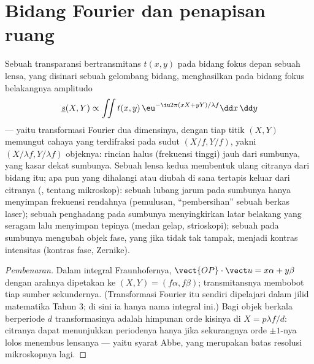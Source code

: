 \section{Bidang Fourier dan penapisan ruang}

\begin{proposition}\label{prop:b2:diffraction:fourier}
Sebuah transparansi bertransmitans $t(x, y)$ pada bidang fokus depan sebuah
lensa, yang disinari sebuah gelombang bidang, menghasilkan pada bidang fokus belakangnya
amplitudo
\[
\underline s(X, Y) \propto \iint t(x, y)\,\eu^{-\iu2\pi(xX + yY)/\lambda f}\dd x\,\dd y
\]
--- yaitu transformasi Fourier dua dimensinya, dengan tiap titik $(X, Y)$
\emph{} memungut cahaya yang terdifraksi pada sudut
$(X/f, Y/f)$, yakni \emph{} $(X/\lambda f, Y/\lambda f)$
objeknya: rincian halus (frekuensi tinggi) jauh dari sumbunya, yang kasar
dekat sumbunya. Sebuah lensa kedua membentuk ulang citranya dari bidang itu; apa pun
yang dihalangi atau diubah di sana tertapis keluar dari citranya
(\emph{},  tentang mikroskop): sebuah lubang jarum
pada sumbunya hanya menyimpan frekuensi rendahnya (pemulusan, ``pembersihan'' sebuah
berkas laser); sebuah penghadang pada sumbunya menyingkirkan latar belakang yang seragam lalu
menyimpan tepinya (medan gelap, strioskopi); sebuah  pada
sumbunya mengubah objek fase, yang jika tidak tak tampak, menjadi kontras intensitas
(kontras fase, Zernike).
\end{proposition}

\begin{proof}[Pembenaran]
Dalam integral Fraunhofernya, $\vect{OP}\cdot\vect u = x\alpha + y\beta$ dengan
arahnya dipetakan ke $(X, Y) = (f\alpha, f\beta)$; transmitansnya membobot
tiap sumber sekundernya. (Transformasi Fourier itu sendiri dipelajari dalam
jilid matematika Tahun 3; di sini ia hanya nama integral ini.)
Bagi objek berkala berperiode $d$ transformasinya adalah himpunan orde
kisinya di $X = p\lambda f/d$: citranya dapat menunjukkan periodenya hanya jika sekurangnya
orde $\pm1$-nya lolos menembus lensanya --- yaitu syarat Abbe, yang merupakan
batas resolusi mikroskopnya lagi.
\end{proof}


